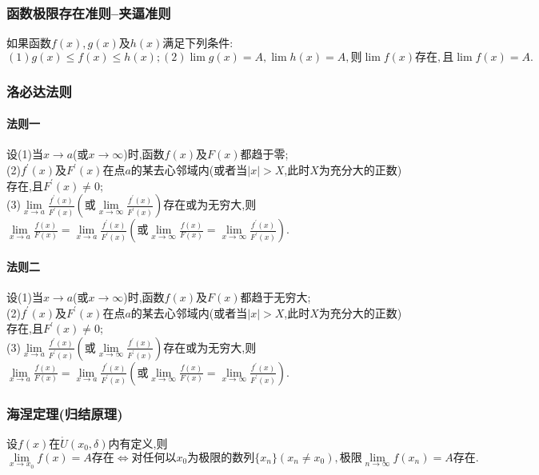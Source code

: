 \documentclass[10pt,a4paper,UTF8]{ctexart}
\begin{document}
\subsubsection{函数极限存在准则--夹逼准则}
如果函数$f(x),g(x)$及$h(x)$满足下列条件:
$(1)g(x)\leq f(x)\leq h(x);(2)\lim{g(x)}=A,\lim{h(x)}=A,\textit{则}\lim{f(x)}\textit{存在},\textit{且}\lim{f(x)}=A.$
\subsubsection{洛必达法则}
\paragraph{法则一}设(1)当$x\to a$(或$x\to \infty$)时,函数$f(x)$及$F(x)$都趋于零;\\
(2)$f^{\prime}(x)$及$F^{\prime}(x)$在点$a$的某去心邻域内(或者当$|x|>X$,此时$X$为充分大的正数)存在,且$F^{\prime}(x)\neq 0$;\\
(3)$\lim\limits_{x\to a}{\frac{f^{\prime}(x)}{F^{\prime}(x)}}(\textit{或}\lim\limits_{x\to \infty}{\frac{f^{\prime}(x)}{F^{\prime}(x)}})$存在或为无穷大,则$\lim\limits_{x\to a}{\frac{f(x)}{F(x)}}=\lim\limits_{x\to a}{\frac{f^{\prime}(x)}{F^{\prime}(x)}}(\textit{或}\lim\limits_{x\to \infty}{\frac{f(x)}{F(x)}}=\lim\limits_{x\to \infty}{\frac{f^{\prime}(x)}{F^{\prime}(x)}}).$
\paragraph{法则二}设(1)当$x\to a$(或$x\to \infty$)时,函数$f(x)$及$F(x)$都趋于无穷大;\\
(2)$f^{\prime}(x)$及$F^{\prime}(x)$在点$a$的某去心邻域内(或者当$|x|>X$,此时$X$为充分大的正数)存在,且$F^{\prime}(x)\neq 0$;\\
(3)$\lim\limits_{x\to a}{\frac{f^{\prime}(x)}{F^{\prime}(x)}}(\textit{或}\lim\limits_{x\to \infty}{\frac{f^{\prime}(x)}{F^{\prime}(x)}})$存在或为无穷大,则$\lim\limits_{x\to a}{\frac{f(x)}{F(x)}}=\lim\limits_{x\to a}{\frac{f^{\prime}(x)}{F^{\prime}(x)}}(\textit{或}\lim\limits_{x\to \infty}{\frac{f(x)}{F(x)}}=\lim\limits_{x\to \infty}{\frac{f^{\prime}(x)}{F^{\prime}(x)}}).$
\subsubsection{海涅定理(归结原理)}%
设$f(x)$在$\mathring{U}(x_0,\delta)$内有定义,则\\
\[\lim\limits_{x\to x_0}{f(x)}=A \textit{存在}\Leftrightarrow\textit{对任何以}x_0\textit{为极限的数列}\{x_n\}(x_n\neq x_0),\textit{极限}\lim\limits_{n\to \infty}{f(x_n)}=A\textit{存在.} \]
\end{document}
